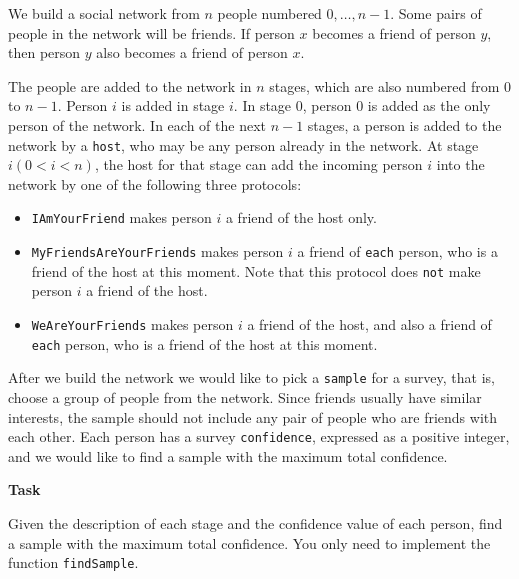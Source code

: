 We build a social network from $n$ people numbered $0, \ldots, n - 1$. Some pairs of people in the network will be friends. If person $x$ becomes a friend of person $y$, then person $y$ also becomes a friend of person $x$.

The people are added to the network in $n$ stages, which are also numbered from $0$ to $n - 1$. Person $i$ is added in stage $i$. In stage $0$, person $0$ is added as the only person of the network. In each of the next $n - 1$ stages, a person is added to the network by a \texttt{host}, who may be any person already in the network. At stage $i (0 < i < n)$, the host for that stage can add the incoming person $i$ into the network by one of the following three protocols:

\begin{itemize}
\item \texttt{IAmYourFriend} makes person $i$ a friend of the host only.
\item \texttt{MyFriendsAreYourFriends} makes person $i$ a friend of \texttt{each} person, who is a friend of the host at this moment. Note that this protocol does \texttt{not} make person $i$ a friend of the host.
\item \texttt{WeAreYourFriends} makes person $i$ a friend of the host, and also a friend of \texttt{each} person, who is a friend of the host at this moment.
\end{itemize}

After we build the network we would like to pick a \texttt{sample} for a survey, that is, choose a group of people from the network. Since friends usually have similar interests, the sample should not include any pair of people who are friends with each other. Each person has a survey \texttt{confidence}, expressed as a positive integer, and we would like to find a sample with the maximum total confidence.

\textbf{Task}

Given the description of each stage and the confidence value of each person, find a sample with the maximum total confidence. You only need to implement the function \texttt{findSample}.

